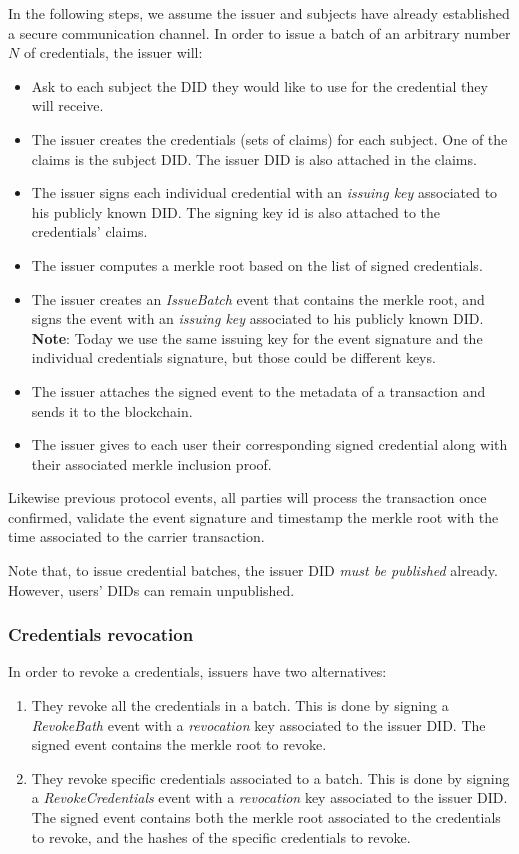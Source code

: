 \documentclass[10pt,a4paper]{article}
\begin{document}
In the following steps, we assume the issuer and subjects have already established a secure communication channel.
In order to issue a batch of an arbitrary number $N$ of credentials, the issuer will:
\begin{itemize}
\item Ask to each subject the DID they would like to use for the credential they will receive.
\item The issuer creates the credentials (sets of claims) for each subject. One of the claims is the subject DID.
      The issuer DID is also attached in the claims.
\item The issuer signs each individual credential with an \emph{issuing key} associated to his publicly known DID. 
      The signing key id is also attached to the credentials' claims.
\item The issuer computes a merkle root based on the list of signed credentials.
\item The issuer creates an \emph{IssueBatch} event that contains the merkle root, and signs the event with an \emph{issuing key} associated to his publicly known DID. 
      \textbf{Note}: Today we use the same issuing key for the event signature and the individual credentials signature, but those could be different keys.
\item The issuer attaches the signed event to the metadata of a transaction and sends it to the blockchain.
\item The issuer gives to each user their corresponding signed credential along with their associated merkle inclusion proof.
\end{itemize}

Likewise previous protocol events, all parties will process the transaction once confirmed, validate the event signature and timestamp the merkle root with the time associated to the carrier transaction.

Note that, to issue credential batches, the issuer DID \emph{must be published} already. However, users' DIDs can remain unpublished.

\subsubsection{Credentials revocation}

In order to revoke a credentials, issuers have two alternatives:
\begin{enumerate}
\item They revoke all the credentials in a batch.
      This is done by signing a \emph{RevokeBath} event with a \emph{revocation} key associated to the issuer DID.
      The signed event contains the merkle root to revoke.
\item They revoke specific credentials associated to a batch.
      This is done by signing a \emph{RevokeCredentials} event with a \emph{revocation} key associated to the issuer DID. 
      The signed event contains both the merkle root associated to the credentials to revoke, and the hashes of the specific credentials to revoke.
\end{enumerate}
\end{document}
